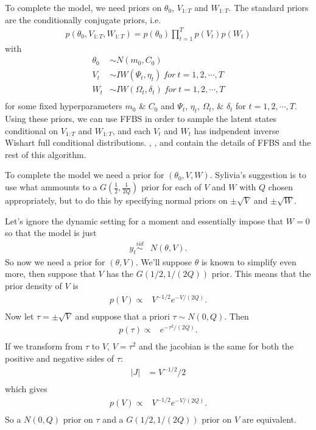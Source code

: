 \documentclass{article}
\begin{document}
To complete the model, we need priors on $\theta_0$, $V_{1:T}$ and $W_{1:T}$. The standard priors are the conditionally conjugate priors, i.e. 
\begin{align*}
  p(\theta_0,V_{1:T},W_{1:T}) = p(\theta_0)\prod_{t=1}^Tp(V_t)p(W_t)
\end{align*}
with
\begin{align*}
  \theta_0 & \sim N(m_0,C_0) \\
  V_t & \sim IW(\Psi_t, \eta_t)\ for\ t=1,2,\cdots,T\\
  W_t & \sim IW(\Omega_t, \delta_t)\ for\ t=1,2,\cdots,T\\
\end{align*}
for some fixed hyperparameters $m_0$ \& $C_0$ and $\Psi_t$, $\eta_t$, $\Omega_t$, \& $\delta_t$ for $t=1,2,\cdots,T$. Using these priors, we can use FFBS in order to sample the latent states conditional on $V_{1:T}$ and $W_{1:T}$, and each $V_t$ and $W_t$ has indpendent inverse Wishart full conditional distributions. \citet{fruhwirth1994data}, \citet{carter1994gibbs}, and \citet{petris2009dynamic} contain the details of FFBS and the rest of this algorithm.

To complete the model we need a prior for $(\theta_0, V, W)$. Sylivia's suggestion is to use what ammounts to a $G\left(\frac{1}{2}, \frac{1}{2Q}\right)$ prior for each of $V$ and $W$ with $Q$ chosen appropriately, but to do this by specifying normal priors on $\pm \sqrt{V}$ and $\pm \sqrt{W}$.

Let's ignore the dynamic setting for a moment and essentially impose that $W=0$ so that the model is just
\begin{align*}
  y_t \stackrel{iid}{\sim} & N(\theta, V).
\end{align*}
So now we need a prior for $(\theta, V)$.  We'll suppose $\theta$ is known to simplify even more, then suppose that $V$ has the $G(1/2, 1/(2Q))$ prior. This means that the prior density of $V$ is
\begin{align*}
  p(V) \propto & V^{-1/2}e^{-V/(2Q)}.\\
\end{align*}
Now let $\tau = \pm \sqrt{V}$ and suppose that a priori $\tau \sim N(0,Q)$. Then
\begin{align*}
  p(\tau) \propto & e^{-\tau^2/(2Q)}.\\
\end{align*}
If we transform from $\tau$ to $V$, $V=\tau^2$ and the jacobian is the same for both the positive and negative sides of $\tau$:
\begin{align*}
  |J| & = V^{-1/2}/2\\
\end{align*}
which gives 
\begin{align*}
  p(V) \propto & V^{-1/2} e^{-V/(2Q)}.\\
\end{align*}
So a $N(0,Q)$ prior on $\tau$ and a $G(1/2, 1/(2Q))$ prior on $V$ are equivalent. 
\end{document}
